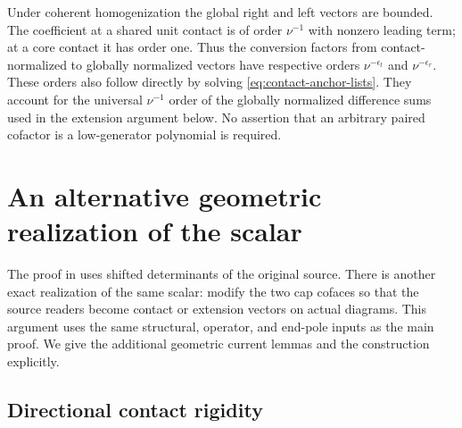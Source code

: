 \documentclass[11pt,a4paper]{amsart}
\numberwithin{equation}{section}
\theoremstyle{plain}
\theoremstyle{definition}
\begin{document}
Under coherent homogenization the global right and left vectors are
bounded.  The coefficient at a shared unit contact is of order
\(\nu^{-1}\) with nonzero leading term; at a core contact it has order one.
Thus the conversion factors from contact-normalized to globally
normalized vectors have respective orders \(\nu^{-\epsilon_t}\) and
\(\nu^{-\epsilon_r}\).  These orders also follow directly by solving
\eqref{eq:contact-anchor-lists}.  They account for the universal
\(\nu^{-1}\) order of the globally normalized difference sums used in the
extension argument below.  No assertion that an arbitrary paired cofactor
is a low-generator polynomial is required.


\section{An alternative geometric realization of the scalar}\label{app:alternative}

The proof in  uses shifted determinants of the
original source.  There is another exact realization of the same scalar:
modify the two cap cofaces so that the source readers become contact or
extension vectors on actual diagrams.  This argument uses the same
structural, operator, and end-pole inputs as the main proof.  We give the
additional geometric current lemmas and the construction explicitly.

\subsection{Directional contact rigidity}
\end{document}
